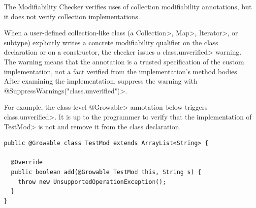 
The Modifiability Checker verifies uses of collection modifiability annotations,
but it does not verify collection implementations.

When a user-defined collection-like class (a \<Collection>, \<Map>,
\<Iterator>, or subtype) explicitly writes a concrete modifiability qualifier
on the class declaration or on a constructor, the checker issues a
\<class.unverified> warning.  The warning means that the
annotation is a trusted specification of the custom implementation, not a fact
verified from the implementation's method bodies.  After examining the
implementation, suppress the warning with
\<@SuppressWarnings("class.unverified")>.

For example, the class-level \<@Growable> annotation below triggers
\<class.unverified>. It is up to the programmer to verify that
the implementation of \<TestMod> is not \@Growable and remove it from the class declaration.
\begin{Verbatim}
public @Growable class TestMod extends ArrayList<String> {

  @Override
  public boolean add(@Growable TestMod this, String s) {
    throw new UnsupportedOperationException();
  }
}
\end{Verbatim}




